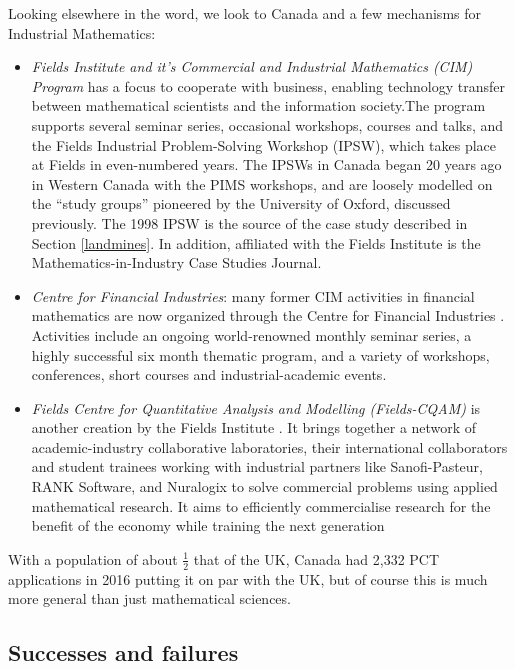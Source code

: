 \documentclass[11pt]{article} %
\begin{document}
	Looking elsewhere in the word, we look to Canada and a few  mechanisms for Industrial Mathematics: 
	

	\begin{itemize}
		\item \textit{Fields Institute and it's Commercial and Industrial Mathematics (CIM) Program} \cite{FieldsCIM}  has a focus to cooperate with business, enabling technology transfer between mathematical scientists and the information society.The program supports several seminar series, occasional workshops, courses and talks, and the Fields Industrial Problem-Solving Workshop (IPSW), which takes place at Fields in even-numbered years. The IPSWs in Canada began 20 years ago in Western Canada with the PIMS workshops, and are loosely modelled on the “study groups” pioneered by the University of Oxford, discussed previously. The 1998 IPSW is the source of the case study described in Section \ref{landmines}.
		 In addition, affiliated with  the Fields Institute is the  Mathematics-in-Industry Case Studies Journal.
		\item \textit{Centre for Financial Industries}: many former CIM activities in financial mathematics are now organized through the Centre for Financial Industries \cite{FieldsCFI}. Activities include an ongoing world-renowned monthly seminar series, a highly successful six month thematic program, and a variety of workshops, conferences, short courses and industrial-academic events. 
		\item \textit{Fields Centre for Quantitative Analysis and Modelling (Fields-CQAM)} is another creation by the Fields Institute \cite{CQAM}. It brings together a network of academic-industry collaborative laboratories, their international collaborators and  student trainees working   with industrial partners like Sanofi-Pasteur, RANK Software, and Nuralogix to solve commercial problems using applied mathematical research. It aims to efficiently commercialise research for the benefit of the economy while training the next generation 
	\end{itemize}
	

	
With a population of about $\frac{1}{2}$ that of the UK, Canada had 2,332 PCT applications in 2016 \cite{WIPO} putting it on par with the UK, but of course this is much more general than just mathematical sciences.

	\subsection{Successes and failures}
	
\end{document}
